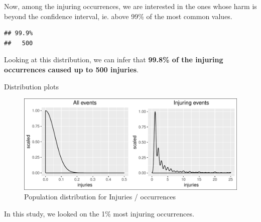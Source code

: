 \documentclass[]{article}
\begin{document}
Now, among the injuring occurrences, we are interested in the ones whose
harm is beyond the confidence interval, ie. above 99\% of the most
common values.

\begin{verbatim}
## 99.9% 
##   500
\end{verbatim}

Looking at this distribution, we can infer that \textbf{99.8\% of the
injuring occurrences caused up to 500 injuries}.

Distribution plots

\begin{figure}[h!]
\centering
\includegraphics{readme_files/figure-latex/inj-distribution-1.pdf}
\caption{Population distribution for Injuries / occurrences}
\end{figure}

In this study, we looked on the 1\% most injuring occurrences.
\end{document}
